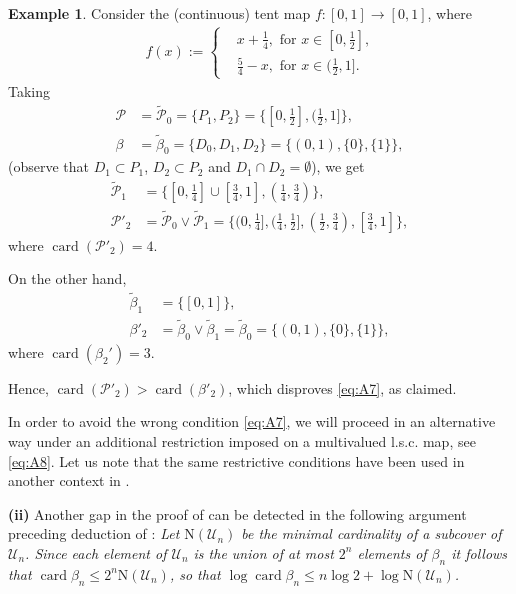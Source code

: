 \documentclass[12pt]{amsart}
\theoremstyle{definition}
\newtheorem{example}{Example}
\newcommand{\U}{\mathcal{U}}
\newcommand{\card}{\operatorname{card}}
\renewcommand{\P}{{\mathcal{P}}}
\newcommand{\NN}{{\mathrm{N}}}
\begin{document}
\begin{example}
Consider the (continuous) tent map $f:[0,1]\to[0,1]$, where
\begin{align*}
f(x):=
\begin{cases}
&x + \frac14,\mbox{ for $x\in[0,\frac12]$,}\\
&\frac54-x, \mbox{ for $x\in(\frac12,1]$.}
\end{cases}
\end{align*}
Taking
\begin{align*}
\P &= \tilde{\P}_0 = \{P_1,P_2\} = \{[0,\frac12],(\frac12,1]\},\\
\beta &= \tilde{\beta}_0 = \{D_0,D_1,D_2\} = \{(0,1),\{0\},\{1\}\},
\end{align*}
(observe that $D_1\subset P_1$, $D_2\subset P_2$ and $D_1\cap D_2 = \emptyset$), we get
\begin{align*}
\tilde{\P}_1 &= \{[0,\frac14]\cup[\frac34,1],(\frac14,\frac34)\},\\
\P'_2  &= \tilde{\P}_0\vee\tilde{\P}_1 = \{(0,\frac14],(\frac14,\frac12],(\frac12,\frac34),[\frac34,1]\},
\end{align*}
where $\card(\P'_2) = 4$.

On the other hand,
\begin{align*}
\tilde{\beta}_1 &= \{[0,1]\},\\
\beta'_2 &= \tilde{\beta}_0\vee\tilde{\beta}_1 = \tilde{\beta}_0 = \{(0,1),\{0\},\{1\}\},
\end{align*}
where $\card(\beta_2')=3$.

Hence, $\card(\P'_2) > \card(\beta'_2)$, which disproves \eqref{eq:A7}, as claimed.
\end{example}

In order to avoid the wrong condition \eqref{eq:A7}, we will proceed in an alternative way under an additional restriction imposed on a multivalued l.s.c. map, see \eqref{eq:A8}. Let us note that the same restrictive conditions have been used in another context in \cite[Proposition 1]{VS}.

\medskip

\textbf{(ii) } Another gap in the proof of \cite[Theorem 3.2]{VS} can be detected in the following argument preceding deduction of \cite[inequality (11)]{VS}: \emph{Let $\NN(\U_n)$ be the minimal cardinality of a subcover of $\U_n$. Since each element of $\U_n$ is the union of at most $2^n$ elements of $\beta_n$ it follows that $\card\beta_n\leq 2^n \NN(\U_n)$, so that $\log \card\beta_n \leq n\log 2 + \log \NN(\U_n)$.}
\end{document}
